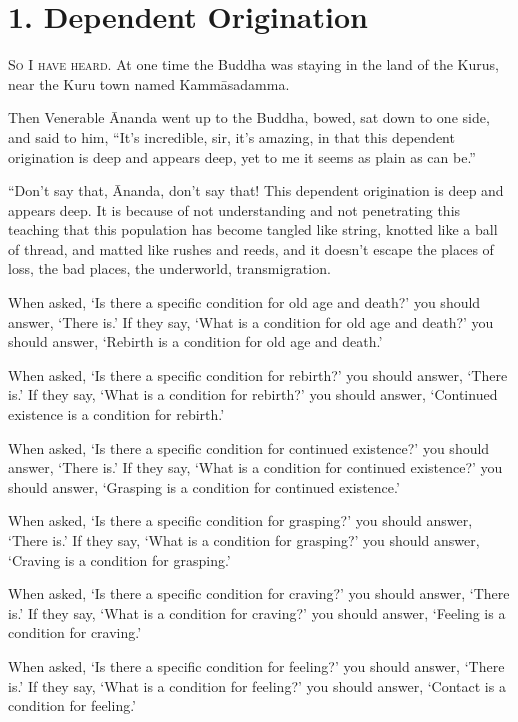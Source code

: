 \documentclass[12pt,openany]{book}%
\newcommand*{\scevam}[1]{\textsc{#1}}
\begin{document}
\section*{1. Dependent Origination }

\scevam{So I have heard. }At one time the Buddha was staying in the land of the Kurus, near the Kuru town named \textsanskrit{Kammāsadamma}. 

Then Venerable Ānanda went up to the Buddha, bowed, sat down to one side, and said to him, “It’s incredible, sir, it’s amazing, in that this dependent origination is deep and appears deep, yet to me it seems as plain as can be.” 

“Don’t say that, Ānanda, don’t say that! This dependent origination is deep and appears deep. It is because of not understanding and not penetrating this teaching that this population has become tangled like string, knotted like a ball of thread, and matted like rushes and reeds, and it doesn’t escape the places of loss, the bad places, the underworld, transmigration. 

When asked, ‘Is there a specific condition for old age and death?’ you should answer, ‘There is.’ If they say, ‘What is a condition for old age and death?’ you should answer, ‘Rebirth is a condition for old age and death.’ 

When asked, ‘Is there a specific condition for rebirth?’ you should answer, ‘There is.’ If they say, ‘What is a condition for rebirth?’ you should answer, ‘Continued existence is a condition for rebirth.’ 

When asked, ‘Is there a specific condition for continued existence?’ you should answer, ‘There is.’ If they say, ‘What is a condition for continued existence?’ you should answer, ‘Grasping is a condition for continued existence.’ 

When asked, ‘Is there a specific condition for grasping?’ you should answer, ‘There is.’ If they say, ‘What is a condition for grasping?’ you should answer, ‘Craving is a condition for grasping.’ 

When asked, ‘Is there a specific condition for craving?’ you should answer, ‘There is.’ If they say, ‘What is a condition for craving?’ you should answer, ‘Feeling is a condition for craving.’ 

When asked, ‘Is there a specific condition for feeling?’ you should answer, ‘There is.’ If they say, ‘What is a condition for feeling?’ you should answer, ‘Contact is a condition for feeling.’ 
\end{document}
